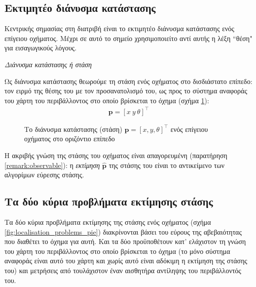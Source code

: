 \subsection{Εκτιμητέο διάνυσμα κατάστασης}
\label{subsection:01_01_02:01}

Κεντρικής σημασίας στη διατριβή είναι το εκτιμητέο διάνυσμα κατάστασης ενός
επίγειου οχήματος. Μέχρι σε αυτό το σημείο χρησιμοποιείτο αντί αυτής η λέξη
``θέση" για εισαγωγικούς λόγους.

\begin{bw_box}
\begin{definition}
  \textit{Διάνυσμα κατάστασης ή στάση}

Ως διάνυσμα κατάστασης θεωρούμε τη στάση ενός οχήματος στο δισδιάστατο επίπεδο:
τον ειρμό της θέσης του με τον προσανατολισμό του, ως προς το σύστημα αναφοράς
του χάρτη του περιβάλλοντος στο οποίο βρίσκεται το όχημα (σχήμα
\ref{fig:pose_figure}):
  \begin{align}
    \bm{p} = [x \ y \ \theta]^\top
\end{align}

\end{definition}
\end{bw_box}

\begin{figure}[htbp]\centering
  
  \caption{\small Το διάνυσμα κατάστασης (στάση) $\bm{p} = [x,y,\theta]^\top$
    ενός επίγειου οχήματος στο οριζόντιο επίπεδο}
  \label{fig:pose_figure}
\end{figure}

Η ακριβής γνώση της στάσης του οχήματος είναι απαγορευμένη (παρατήρηση
\ref{remark:observable}): η \textit{εκτίμηση} $\hat{\bm{p}}$ της στάσης του
είναι το αντικείμενο των αλγορίμων εύρεσης στάσης.



\subsection{Τα δύο κύρια προβλήματα εκτίμησης στάσης}
\label{subsec:01_01_02_2}

Τα δύο κύρια προβλήματα εκτίμησης της στάσης ενός οχήματος (σχήμα
\ref{fig:localisation_problems_pie}) διακρίνονται βάσει του εύρους της
αβεβαιότητας που διαθέτει το όχημα για αυτή.  Και τα δύο προϋποθέτουν
κατ' ελάχιστον τη γνώση του χάρτη του περιβάλλοντος στο οποίο
βρίσκεται το όχημα (το μόνο σύστημα αναφοράς είναι αυτό του χάρτη και χωρίς
αυτό είναι αδόκιμη η εκτίμηση της στάσης του) και μετρήσεις από τουλάχιστον
έναν αισθητήρα αντίληψης του περιβάλλοντός του.

